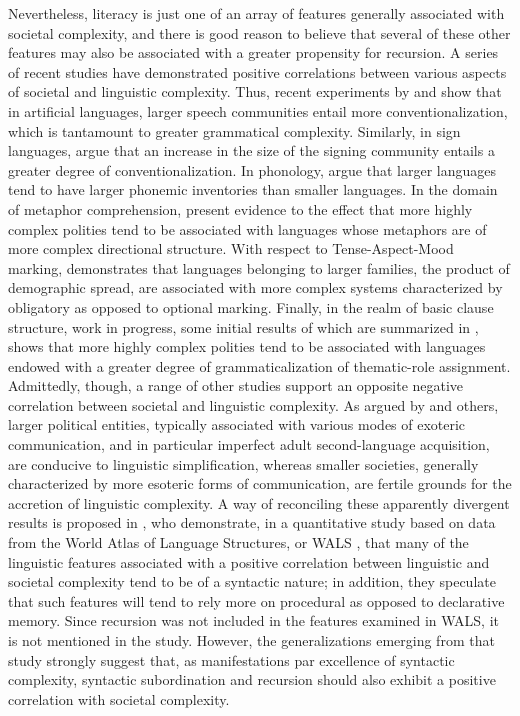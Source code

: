 \documentclass[output=paper,colorlinks,citecolor=brown
]{langscibook}
\begin{document}
Nevertheless, literacy is just one of an array of features generally associated with societal complexity, and there is good reason to believe that several of these other features may also be associated with a greater propensity for recursion.  A series of recent studies have demonstrated positive correlations between various aspects of societal and linguistic complexity.  Thus, recent experiments by \citet{raviv2019larger,raviv2020role} and \citet{raviv2020language} show that in artificial languages, larger speech communities entail more conventionalization, which is tantamount to greater grammatical complexity. Similarly, in sign languages, \citet{meir2012influence, ergin2020community} argue that an increase in the size of the signing community entails a greater degree of conventionalization.  In phonology, \citet{hay2007phoneme,atkinson2011phonemic,wichmann2011phonological,nettle2012social} argue that larger languages tend to have larger phonemic inventories than smaller languages. In the domain of metaphor comprehension, \citet{gil2021metaphors} present evidence to the effect that more highly complex polities tend to be associated with languages whose metaphors are of more complex directional structure.  With respect to Tense-Aspect-Mood marking, \citet{gil2021tense} demonstrates that languages belonging to larger families, the product of demographic spread, are associated with more complex systems characterized by obligatory as opposed to optional marking.  Finally, in the realm of basic clause structure, work in progress, some initial results of which are summarized in \citet{gil2019grammar}, shows that more highly complex polities tend to be associated with languages endowed with a greater degree of grammaticalization of thematic-role assignment.  Admittedly, though, a range of other studies support an opposite negative correlation between societal and linguistic complexity.  As argued by \citet{mcwhorter2018creole,mcwhorter2005defining,mcwhorter2011linguistic,dahl2004growth,wray2007consequences,lupyan2010language,trudgill2011sociolinguistic} and others, larger political entities, typically associated with various modes of exoteric communication, and in particular imperfect adult second-language acquisition, are conducive to linguistic simplification, whereas smaller societies, generally characterized by more esoteric forms of communication, are fertile grounds for the accretion of linguistic complexity.  A way of reconciling these apparently divergent results is proposed in \citet{chen2023linguistic}, who demonstrate, in a quantitative study based on data from the World Atlas of Language Structures, or WALS \citep{haspelmath2005atlas}, that many of the linguistic features associated with a positive correlation between linguistic and societal complexity tend to be of a syntactic nature; in addition, they speculate that such features will tend to rely more on procedural as opposed to declarative memory. Since recursion was not included in the features examined in WALS, it is not mentioned in the \citet{chen2023linguistic} study.  However, the generalizations emerging from that study strongly suggest that, as manifestations par excellence of syntactic complexity, syntactic subordination and recursion should also exhibit a positive correlation with societal complexity.
\end{document}
